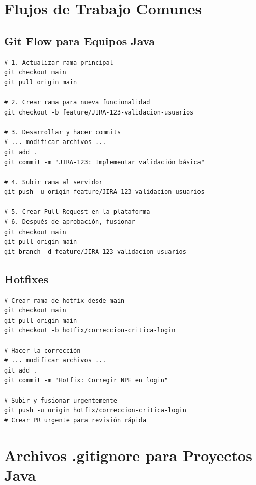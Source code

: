 \documentclass[12pt,a4paper]{article}
\begin{document}
\section{Flujos de Trabajo Comunes}

\subsection{Git Flow para Equipos Java}
\begin{lstlisting}[caption=Flujo típico en proyecto Java]
# 1. Actualizar rama principal
git checkout main
git pull origin main

# 2. Crear rama para nueva funcionalidad
git checkout -b feature/JIRA-123-validacion-usuarios

# 3. Desarrollar y hacer commits
# ... modificar archivos ...
git add .
git commit -m "JIRA-123: Implementar validación básica"

# 4. Subir rama al servidor
git push -u origin feature/JIRA-123-validacion-usuarios

# 5. Crear Pull Request en la plataforma
# 6. Después de aprobación, fusionar
git checkout main
git pull origin main
git branch -d feature/JIRA-123-validacion-usuarios
\end{lstlisting}

\subsection{Hotfixes}
\begin{lstlisting}[caption=Manejo de correcciones urgentes]
# Crear rama de hotfix desde main
git checkout main
git pull origin main
git checkout -b hotfix/correccion-critica-login

# Hacer la corrección
# ... modificar archivos ...
git add .
git commit -m "Hotfix: Corregir NPE en login"

# Subir y fusionar urgentemente
git push -u origin hotfix/correccion-critica-login
# Crear PR urgente para revisión rápida
\end{lstlisting}

\section{Archivos .gitignore para Proyectos Java}
\end{document}
